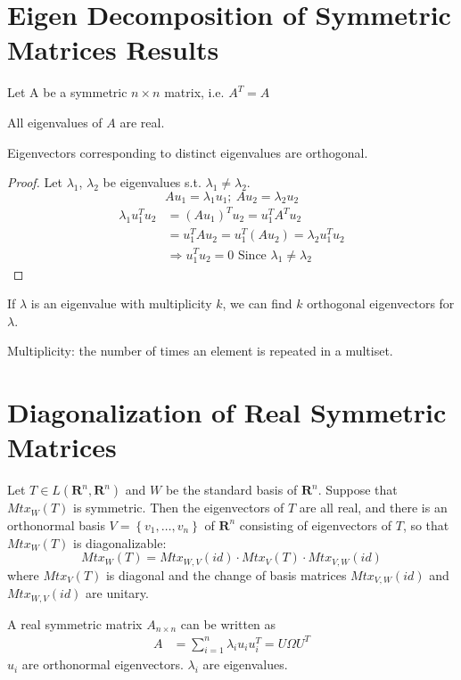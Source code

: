 \documentclass[11pt]{elegantbook}
\begin{document}
\section{Eigen Decomposition of Symmetric Matrices Results}
Let A be a symmetric $n\times n$ matrix, i.e. $A^T=A$
\begin{proposition}
All eigenvalues of $A$ are real.
\end{proposition}
\begin{proposition}
Eigenvectors corresponding to distinct eigenvalues are orthogonal.
\end{proposition}
\begin{proof}
\quad

Let $\lambda_1$, $\lambda_2$ be eigenvalues s.t. $\lambda_1\neq\lambda_2$.
$$Au_1=\lambda_1 u_1;\ Au_2=\lambda_2 u_2$$
\begin{equation}
    \begin{aligned}
        \lambda_1 u_1^Tu_2&=(Au_1)^Tu_2=u^T_1A^Tu_2\\
        &=u^T_1Au_2=u^T_1(Au_2)=\lambda_2 u^T_1u_2\\
        &\Rightarrow	u_1^Tu_2=0\text{ Since }\lambda_1\neq\lambda_2
    \end{aligned}
    \nonumber
\end{equation}
\end{proof}

\begin{proposition}
If $\lambda$ is an eigenvalue with multiplicity $k$, we can find $k$ orthogonal eigenvectors for $\lambda$.
\end{proposition}
Multiplicity: the number of times an element is repeated in a multiset.

\section{Diagonalization of Real Symmetric Matrices}
\begin{theorem}
    Let $T \in L\left(\mathbf{R}^n, \mathbf{R}^n\right)$ and $W$ be the standard basis of $\mathbf{R}^n$. Suppose that $M t x_W(T)$ is symmetric. Then the eigenvectors of $T$ are all real, and there is an orthonormal basis $V=\left\{v_1, \ldots, v_n\right\}$ of $\mathbf{R}^n$ consisting of eigenvectors of $T$, so that $M t x_W(T)$ is diagonalizable:
    $$
    M t x_W(T)=M t x_{W, V}(i d) \cdot M t x_V(T) \cdot M t x_{V, W}(i d)
    $$
    where $M t x_V (T)$ is diagonal and the change of basis matrices $M t x_{V, W}(i d)$ and $M t x_{W, V}(i d)$ are unitary.
\end{theorem}
A real symmetric matrix $A_{n\times n}$ can be written as
\begin{equation}
    \begin{aligned}
        A&=\sum_{i=1}^n\lambda_i u_iu_i^T=U\Omega U^T
    \end{aligned}
    \nonumber
\end{equation}
$u_i$ are orthonormal eigenvectors. $\lambda_i$ are eigenvalues.
\end{document}
